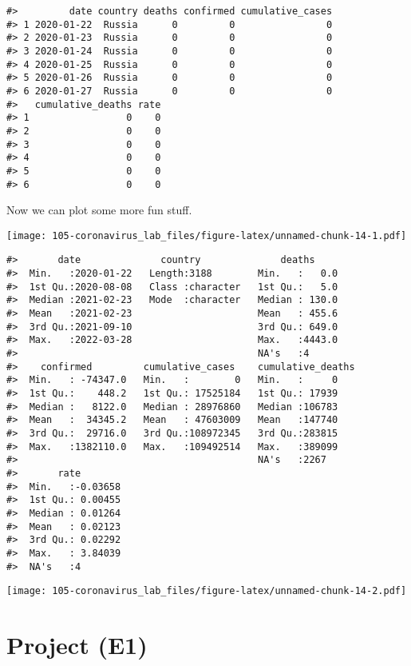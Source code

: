 \documentclass[
]{book}
\begin{document}
\begin{verbatim}
#>         date country deaths confirmed cumulative_cases
#> 1 2020-01-22  Russia      0         0                0
#> 2 2020-01-23  Russia      0         0                0
#> 3 2020-01-24  Russia      0         0                0
#> 4 2020-01-25  Russia      0         0                0
#> 5 2020-01-26  Russia      0         0                0
#> 6 2020-01-27  Russia      0         0                0
#>   cumulative_deaths rate
#> 1                 0    0
#> 2                 0    0
#> 3                 0    0
#> 4                 0    0
#> 5                 0    0
#> 6                 0    0
\end{verbatim}

Now we can plot some more fun stuff.

\texttt{[image: 105-coronavirus\_lab\_files/figure-latex/unnamed-chunk-14-1.pdf]}

\begin{verbatim}
#>       date              country              deaths      
#>  Min.   :2020-01-22   Length:3188        Min.   :   0.0  
#>  1st Qu.:2020-08-08   Class :character   1st Qu.:   5.0  
#>  Median :2021-02-23   Mode  :character   Median : 130.0  
#>  Mean   :2021-02-23                      Mean   : 455.6  
#>  3rd Qu.:2021-09-10                      3rd Qu.: 649.0  
#>  Max.   :2022-03-28                      Max.   :4443.0  
#>                                          NA's   :4       
#>    confirmed         cumulative_cases    cumulative_deaths
#>  Min.   : -74347.0   Min.   :        0   Min.   :     0   
#>  1st Qu.:    448.2   1st Qu.: 17525184   1st Qu.: 17939   
#>  Median :   8122.0   Median : 28976860   Median :106783   
#>  Mean   :  34345.2   Mean   : 47603009   Mean   :147740   
#>  3rd Qu.:  29716.0   3rd Qu.:108972345   3rd Qu.:283815   
#>  Max.   :1382110.0   Max.   :109492514   Max.   :389099   
#>                                          NA's   :2267     
#>       rate         
#>  Min.   :-0.03658  
#>  1st Qu.: 0.00455  
#>  Median : 0.01264  
#>  Mean   : 0.02123  
#>  3rd Qu.: 0.02292  
#>  Max.   : 3.84039  
#>  NA's   :4
\end{verbatim}

\texttt{[image: 105-coronavirus\_lab\_files/figure-latex/unnamed-chunk-14-2.pdf]}

\hypertarget{project-e1}{%
\chapter{Project (E1)}\label{project-e1}}
\end{document}
